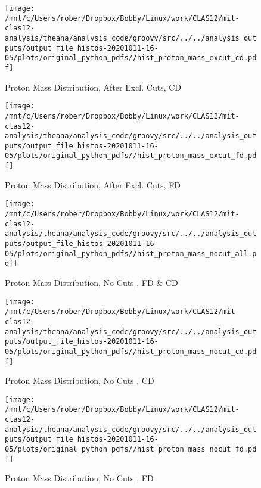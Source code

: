 \documentclass{article}
\begin{document}
\begin{landscape}
\begin{figure}[h]
        \texttt{[image: /mnt/c/Users/rober/Dropbox/Bobby/Linux/work/CLAS12/mit-clas12-analysis/theana/analysis\_code/groovy/src/../../analysis\_outputs/output\_file\_histos-20201011-16-05/plots/original\_python\_pdfs//hist\_proton\_mass\_excut\_cd.pdf]}
        \captionsetup{textformat=empty,labelformat=blank}
        \caption{Proton Mass Distribution, After Excl. Cuts, CD}
    \end{figure}
    \clearpage
    
    \begin{figure}[h]
        \centering

        \texttt{[image: /mnt/c/Users/rober/Dropbox/Bobby/Linux/work/CLAS12/mit-clas12-analysis/theana/analysis\_code/groovy/src/../../analysis\_outputs/output\_file\_histos-20201011-16-05/plots/original\_python\_pdfs//hist\_proton\_mass\_excut\_fd.pdf]}
        \captionsetup{textformat=empty,labelformat=blank}
        \caption{Proton Mass Distribution, After Excl. Cuts, FD}
    \end{figure}
    \clearpage
    
    \begin{figure}[h]
        \centering

        \texttt{[image: /mnt/c/Users/rober/Dropbox/Bobby/Linux/work/CLAS12/mit-clas12-analysis/theana/analysis\_code/groovy/src/../../analysis\_outputs/output\_file\_histos-20201011-16-05/plots/original\_python\_pdfs//hist\_proton\_mass\_nocut\_all.pdf]}
        \captionsetup{textformat=empty,labelformat=blank}
        \caption{Proton Mass Distribution, No Cuts , FD \& CD}
    \end{figure}
    \clearpage
    
    \begin{figure}[h]
        \centering

        \texttt{[image: /mnt/c/Users/rober/Dropbox/Bobby/Linux/work/CLAS12/mit-clas12-analysis/theana/analysis\_code/groovy/src/../../analysis\_outputs/output\_file\_histos-20201011-16-05/plots/original\_python\_pdfs//hist\_proton\_mass\_nocut\_cd.pdf]}
        \captionsetup{textformat=empty,labelformat=blank}
        \caption{Proton Mass Distribution, No Cuts , CD}
    \end{figure}
    \clearpage
    
    \begin{figure}[h]
        \centering

        \texttt{[image: /mnt/c/Users/rober/Dropbox/Bobby/Linux/work/CLAS12/mit-clas12-analysis/theana/analysis\_code/groovy/src/../../analysis\_outputs/output\_file\_histos-20201011-16-05/plots/original\_python\_pdfs//hist\_proton\_mass\_nocut\_fd.pdf]}
        \captionsetup{textformat=empty,labelformat=blank}
        \caption{Proton Mass Distribution, No Cuts , FD}
    \end{figure}
    \clearpage
    

\end{landscape}
\end{document}
